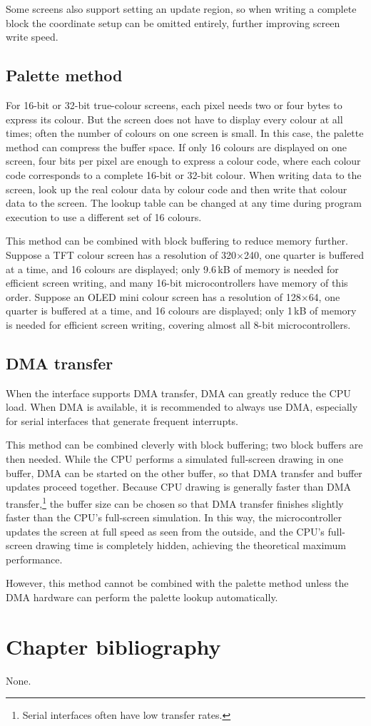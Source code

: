 Some screens also support setting an update region, so when writing a complete block the coordinate setup can be omitted entirely, further improving screen write speed.

\subsection{Palette method}

For 16-bit or 32-bit true-colour screens, each pixel needs two or four bytes to express its colour.
But the screen does not have to display every colour at all times; often the number of colours on one screen is small.
In this case, the palette method can compress the buffer space.
If only 16 colours are displayed on one screen, four bits per pixel are enough to express a colour code, where each colour code corresponds to a complete 16-bit or 32-bit colour.
When writing data to the screen, look up the real colour data by colour code and then write that colour data to the screen.
The lookup table can be changed at any time during program execution to use a different set of 16 colours.

This method can be combined with block buffering to reduce memory further.
Suppose a TFT colour screen has a resolution of 320$\times$240, one quarter is buffered at a time, and 16 colours are displayed; only 9.6\,kB of memory is needed for efficient screen writing, and many 16-bit microcontrollers have memory of this order.
Suppose an OLED mini colour screen has a resolution of 128$\times$64, one quarter is buffered at a time, and 16 colours are displayed; only 1\,kB of memory is needed for efficient screen writing, covering almost all 8-bit microcontrollers.

\subsection{DMA transfer}

When the interface supports DMA transfer, DMA can greatly reduce the CPU load.
When DMA is available, it is recommended to always use DMA, especially for serial interfaces that generate frequent interrupts.

This method can be combined cleverly with block buffering; two block buffers are then needed.
While the CPU performs a simulated full-screen drawing in one buffer, DMA can be started on the other buffer, so that DMA transfer and buffer updates proceed together.
Because CPU drawing is generally faster than DMA transfer,\footnote{Serial interfaces often have low transfer rates.} the buffer size can be chosen so that DMA transfer finishes slightly faster than the CPU's full-screen simulation.
In this way, the microcontroller updates the screen at full speed as seen from the outside, and the CPU's full-screen drawing time is completely hidden, achieving the theoretical maximum performance.

However, this method cannot be combined with the palette method unless the DMA hardware can perform the palette lookup automatically.

\section{Chapter bibliography}

None.
